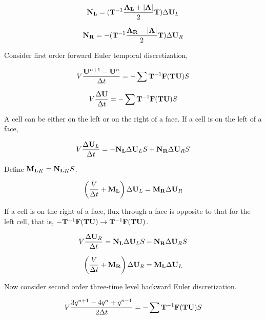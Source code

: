 \documentclass{article}
\begin{document}
\begin{equation}
    \mathbf{N_L}
    =
    (\mathbf{T}^{-1}\frac{\mathbf{A_L} + \lvert\mathbf{A}\rvert}{2}\mathbf{T})\Delta\mathbf{U}_L
\end{equation}

\begin{equation}
    \mathbf{N_R}
    =
    -(\mathbf{T}^{-1}\frac{\mathbf{A_R} - \lvert\mathbf{A}\rvert}{2}\mathbf{T})\Delta\mathbf{U}_R
\end{equation}

Consider first order forward Euler temporal discretization,

\begin{equation}
    V\frac{\mathbf{U}^{n+1} - \mathbf{U}^{n}}{\Delta t}
    =
    -\sum\mathbf{T}^{-1}\mathbf{F}(\mathbf{T}\mathbf{U})S
\end{equation}

\begin{equation}
    V\frac{\Delta\mathbf{U}}{\Delta t}
    =
    -\sum\mathbf{T}^{-1}\mathbf{F}(\mathbf{T}\mathbf{U})S
\end{equation}

A cell can be either on the left or on the right of a face. If a cell is on the left of a face,

\begin{equation}
    V\frac{\Delta\mathbf{U}_L}{\Delta t}
    =
    -\mathbf{N_L}\Delta\mathbf{U}_LS
    +
    \mathbf{N_R}\Delta\mathbf{U}_RS
\end{equation}

Define $\mathbf{M_L}_K = \mathbf{N_L}_K S$.

\begin{equation}
    \left(
        \frac{V}{\Delta t} + \mathbf{M_L}
    \right)
    \Delta\mathbf{U}_L
    =
    \mathbf{M_R}\Delta\mathbf{U}_R
\end{equation}

If a cell is on the right of a face, flux through a face is opposite to that for the left cell, that is, $-\mathbf{T}^{-1}\mathbf{F}(\mathbf{T}\mathbf{U}) \rightarrow \mathbf{T}^{-1}\mathbf{F}(\mathbf{T}\mathbf{U})$.

\begin{equation}
    V\frac{\Delta\mathbf{U}_R}{\Delta t}
    =
    \mathbf{N_L}\Delta\mathbf{U}_LS
    -
    \mathbf{N_R}\Delta\mathbf{U}_RS
\end{equation}

\begin{equation}
    \left(
        \frac{V}{\Delta t} + \mathbf{M_R}
    \right)
    \Delta\mathbf{U}_R
    =
    \mathbf{M_L}\Delta\mathbf{U}_L
\end{equation}

Now consider second order three-time level backward Euler discretization.

\begin{equation}
    V\frac{3q^{n+1}-4q^n+q^{n-1}}{2\Delta t}
    =
    -\sum\mathbf{T}^{-1}\mathbf{F}(\mathbf{T}\mathbf{U})S
\end{equation}
\end{document}
